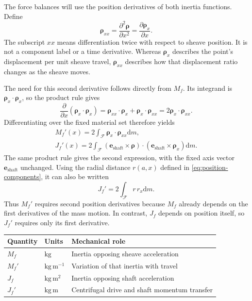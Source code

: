 \documentclass[11pt,letterpaper]{article}
\numberwithin{equation}{section}
\newcommand{\dd}{\mathrm{d}}
\newcommand{\e}{\bm e_{\mathrm{shaft}}}
\newcommand{\rhoo}{\bm\rho}
\begin{document}
The force balances will use the position derivatives of both inertia functions. Define
\begin{equation}
  \rhoo_{xx}=\frac{\partial^2\rhoo}{\partial x^2}
            =\frac{\partial\rhoo_x}{\partial x}.
  \label{eq:rho-xx}
\end{equation}
The subscript $xx$ means differentiation twice with respect to sheave position. It is not a component label or a time derivative. Whereas $\rhoo_x$ describes the point's displacement per unit sheave travel, $\rhoo_{xx}$ describes how that displacement ratio changes as the sheave moves.

The need for this second derivative follows directly from $M_f$. Its integrand is $\rhoo_x\cdot\rhoo_x$, so the product rule gives
\begin{equation}
  \frac{\partial}{\partial x}(\rhoo_x\cdot\rhoo_x)
  =\rhoo_{xx}\cdot\rhoo_x+\rhoo_x\cdot\rhoo_{xx}
  =2\rhoo_x\cdot\rhoo_{xx}.
\end{equation}
Differentiating over the fixed material set therefore yields
\begin{align}
  \boxed{M_f'(x)=2\int_{\mathcal F}
                \rhoo_x\cdot\rhoo_{xx}\dd m,}
       \label{eq:Mprime-definition}\\[0.3em]
  \boxed{J_f'(x)=2\int_{\mathcal F}
          (\e\times\rhoo)\cdot(\e\times\rhoo_x)\dd m.}
       \label{eq:Jprime-definition}
\end{align}
The same product rule gives the second expression, with the fixed axis vector $\e$ unchanged. Using the radial distance $r(a,x)$ defined in \cref{eq:position-components}, it can also be written
\begin{equation}
  J_f'=2\int_{\mathcal F}r\,r_x\dd m.
  \label{eq:Jprime-radial}
\end{equation}
Thus $M_f'$ requires second position derivatives because $M_f$ already depends on the first derivatives of the mass motion. In contrast, $J_f$ depends on position itself, so $J_f'$ requires only its first derivative.

\begin{center}
\begin{tabular}{@{}lll@{}}
\toprule
Quantity & Units & Mechanical role\\
\midrule
$M_f$ & $\mathrm{kg}$ & Inertia opposing sheave acceleration\\
$M_f'$ & $\mathrm{kg\,m^{-1}}$ & Variation of that inertia with travel\\
$J_f$ & $\mathrm{kg\,m^2}$ & Inertia opposing shaft acceleration\\
$J_f'$ & $\mathrm{kg\,m}$ & Centrifugal drive and shaft momentum transfer\\
\bottomrule
\end{tabular}
\end{center}
\end{document}
